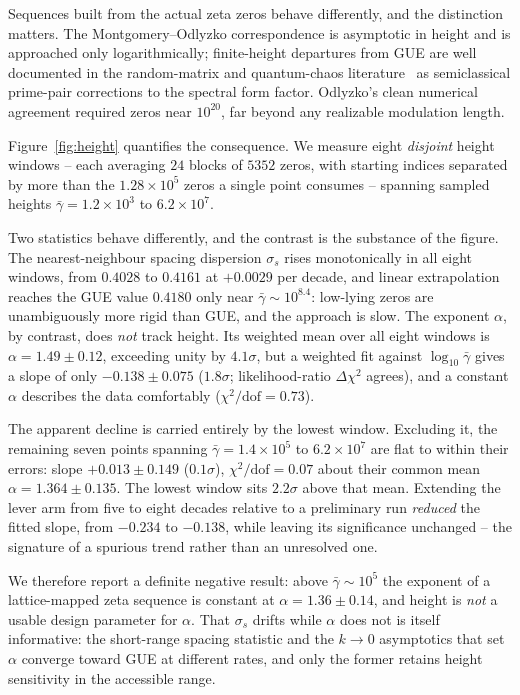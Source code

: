 \documentclass[
  aps,
  prl,
  reprint,
  amsmath,
  amssymb,
  superscriptaddress,
  floatfix,
  nofootinbib
]{revtex4-2}
\begin{document}
Sequences built from the actual zeta zeros behave differently, and the
distinction matters. The Montgomery--Odlyzko correspondence is asymptotic in
height and is approached only logarithmically; finite-height departures from
GUE are well documented in the random-matrix and quantum-chaos
literature~\cite{Odlyzko1987,Berry1988} as semiclassical prime-pair
corrections to the spectral form factor. Odlyzko's clean numerical agreement
required zeros near $10^{20}$, far beyond any realizable modulation length.

Figure~\ref{fig:height} quantifies the consequence. We measure eight
\emph{disjoint} height windows -- each averaging $24$ blocks of $5352$ zeros,
with starting indices separated by more than the $1.28\times10^{5}$ zeros a
single point consumes -- spanning sampled heights
$\bar\gamma=1.2\times10^{3}$ to $6.2\times10^{7}$.

Two statistics behave differently, and the contrast is the substance of the
figure. The nearest-neighbour spacing dispersion $\sigma_s$ rises
monotonically in all eight windows, from $0.4028$ to $0.4161$ at
$+0.0029$ per decade, and linear extrapolation reaches the GUE value $0.4180$
only near $\bar\gamma\sim10^{8.4}$: low-lying zeros are unambiguously more
rigid than GUE, and the approach is slow. The exponent $\alpha$, by contrast,
does \emph{not} track height. Its weighted mean over all eight windows is
$\alpha=1.49\pm0.12$, exceeding unity by $4.1\sigma$, but a weighted fit
against $\log_{10}\bar\gamma$ gives a slope of only $-0.138\pm0.075$
($1.8\sigma$; likelihood-ratio $\Delta\chi^{2}$ agrees), and a constant
$\alpha$ describes the data comfortably ($\chi^{2}/\mathrm{dof}=0.73$).

The apparent decline is carried entirely by the lowest window. Excluding it,
the remaining seven points spanning $\bar\gamma=1.4\times10^{5}$ to
$6.2\times10^{7}$ are flat to within their errors: slope $+0.013\pm0.149$
($0.1\sigma$), $\chi^{2}/\mathrm{dof}=0.07$ about their common mean
$\alpha=1.364\pm0.135$. The lowest window sits $2.2\sigma$ above that mean.
Extending the lever arm from five to eight decades relative to a preliminary
run \emph{reduced} the fitted slope, from $-0.234$ to $-0.138$, while leaving
its significance unchanged -- the signature of a spurious trend rather than an
unresolved one.

We therefore report a definite negative result: above
$\bar\gamma\sim10^{5}$ the exponent of a lattice-mapped zeta sequence is
constant at $\alpha=1.36\pm0.14$, and height is \emph{not} a usable design
parameter for $\alpha$. That $\sigma_s$ drifts while $\alpha$ does not is
itself informative: the short-range spacing statistic and the $k\to0$
asymptotics that set $\alpha$ converge toward GUE at different rates, and only
the former retains height sensitivity in the accessible range.
\end{document}
